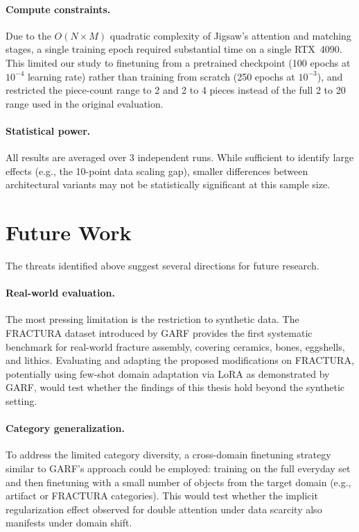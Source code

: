\paragraph{Compute constraints.} Due to the $O(N \times M)$ quadratic complexity of Jigsaw's attention and matching stages, a single training epoch required substantial time on a single RTX~4090. This limited our study to finetuning from a pretrained checkpoint (100 epochs at $10^{-4}$ learning rate) rather than training from scratch (250 epochs at $10^{-3}$), and restricted the piece-count range to 2 and 2 to 4 pieces instead of the full 2 to 20 range used in the original evaluation.

\paragraph{Statistical power.} All results are averaged over 3 independent runs. While sufficient to identify large effects (e.g., the 10-point data scaling gap), smaller differences between architectural variants may not be statistically significant at this sample size.

\section{Future Work}

The threats identified above suggest several directions for future research.

\paragraph{Real-world evaluation.} The most pressing limitation is the restriction to synthetic data. The FRACTURA dataset introduced by GARF \cite{Li2025GARF} provides the first systematic benchmark for real-world fracture assembly, covering ceramics, bones, eggshells, and lithics. Evaluating and adapting the proposed modifications on FRACTURA, potentially using few-shot domain adaptation via LoRA as demonstrated by GARF, would test whether the findings of this thesis hold beyond the synthetic setting.

\paragraph{Category generalization.} To address the limited category diversity, a cross-domain finetuning strategy similar to GARF's approach could be employed: training on the full everyday set and then finetuning with a small number of objects from the target domain (e.g., artifact or FRACTURA categories). This would test whether the implicit regularization effect observed for double attention under data scarcity also manifests under domain shift.

